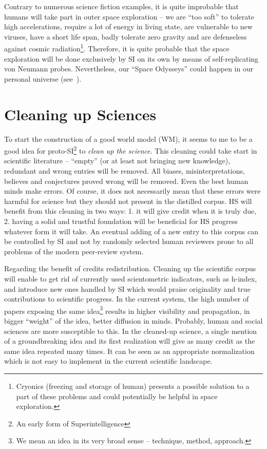 \documentclass[a4paper,11pt]{article}
\begin{document}
Contrary to numerous science fiction examples, it is quite improbable that humans will take part in outer space exploration -- we are ``too soft'' to tolerate high accelerations, require a lot of energy in living state, are vulnerable to new viruses, have a short life span, badly tolerate zero gravity and are defenseless against cosmic radiation\footnote{Cryonics (freezing and storage of human) presents a possible solution to a part of these problems and could potentially be helpful in space exploration.}. Therefore, it is quite probable that the space exploration will be done exclusively by SI on its own by means of self-replicating von Neumann probes. Nevertheless, our ``Space Odysseys'' could happen in our personal universe (see~).

\section{Cleaning up Sciences}

To start the construction of a good world model (WM), it seems to me to be a good idea for proto-SI\footnote{An early form of Superintelligence} to \emph{clean up the science}. This cleaning could take start in scientific literature -- ``empty'' (or at least not bringing new knowledge), redundant and wrong entries will be removed. All biases, misinterpretations, believes and conjectures proved wrong will be removed.  Even the best human minds make errors. Of course, it does not necessarily mean that these errors were harmful for science but they should not present in the distilled corpus. HS will benefit from this cleaning in two ways: 1. it will give credit when it is truly due, 2. having a solid and trustful foundation will be beneficial for HS progress whatever form it will take. An eventual adding of a new entry to this corpus can be controlled by SI and not by randomly selected human reviewers prone to all problems of the modern peer-review system.

Regarding the benefit of credits redistribution. Cleaning up the scientific corpus will enable to get rid of currently used scientometric indicators, such as h-index, and introduce new ones handled by SI which would praise originality and true contributions to scientific progress. In the current system, the high number of papers exposing the same idea\footnote{We mean an idea in its very broad sense -- technique, method, approach.} results in higher visibility and propagation, in bigger ``weight'' of the idea, better diffusion in minds. Probably, human and social sciences are more susceptible to this. In the cleaned-up science, a single mention of a groundbreaking idea and its first realization will give as many credit as the same idea repeated many times. It can be seen as an appropriate normalization which is not easy to implement in the current scientific landscape.
\end{document}
